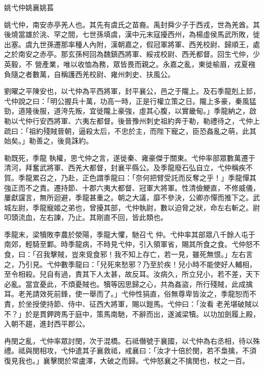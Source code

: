 
\begin{pinyinscope}

 姚弋仲姚襄姚萇



 姚弋仲，南安赤亭羌人也。其先有虞氏之苗裔。禹封舜少子于西戎，世為羌酋。其後燒當雄於洮、罕之間，七世孫填虞，漢中元末寇擾西州，為楊虛侯馬武所敗，徙出塞。虞九世孫遷那率種人內附，漢朝嘉之，假冠軍將軍、西羌校尉、歸順王，處之於南安之赤亭。那玄孫柯回為魏鎮西將軍、綏戎校尉、西羌都督。回生弋仲，少英毅，不
 營產業，唯以收恤為務，眾皆畏而親之。永嘉之亂，東徙榆眉，戎夏襁負隨之者數萬，自稱護西羌校尉、雍州刺史、扶風公。



 劉曜之平陳安也，以弋仲為平西將軍，封平襄公，邑之于隴上。及石季龍剋上邽，弋仲說之曰：「明公握兵十萬，功高一時，正是行權立策之日。隴上多豪，秦風猛勁，道隆後服，道洿先叛，宜徙隴上豪強，虛其心腹，以實畿甸。」季龍納之，啟勒以弋仲行安西將軍、六夷左都督。後晉豫州刺史祖約奔于勒，勒禮待之，弋仲上疏曰：「祖約殘賊晉朝，逼殺太后，不忠於主，而陛下寵之，臣恐姦亂之萌，此其始矣。」勒善之，後竟誅約。



 勒既死，季龍
 執權，思弋仲之言，遂徙秦、雍豪傑于關東。弋仲率部眾數萬遷于清河，拜奮武將軍、西羌大都督，封襄平縣公。及季龍廢石弘自立，弋仲稱疾不賀。季龍累召之，乃赴，正色謂季龍曰：「奈何把臂受託而反奪之乎！」季龍憚其強正而不之責。遷持節、十郡六夷大都督、冠軍大將軍。性清儉鯁直，不修威儀，屢獻讜言，無所迴避，季龍甚重之。朝之大議，靡不參決，公卿亦憚而推下之。武城左尉，季龍寵姬之弟也，曾擾其部，弋仲執尉，數以迫脅之狀，命左右斬之。尉叩頭流血，左右諫，乃止。其剛直不回，皆此類也。



 季龍末，梁犢敗李農於滎陽，季龍大懼，馳召弋
 仲。弋仲率其部眾八千餘人屯于南郊，輕騎至鄴。時季龍病，不時見弋仲，引入領軍省，賜其所食之食。弋仲怒不食，曰：「召我擊賊，豈來覓食邪！我不知上存亡，若一見，雖死無恨。」左右言之，乃引見。弋仲數季龍曰：「兒死來愁邪？乃至於疾！兒小時不能使好人輔相，至令相殺。兒自有過，責其下人太甚，故反耳。汝病久，所立兒小，若不差，天下必亂。當宜憂此，不煩憂賊也。犢等因思歸之心，共為姦盜，所行殘賊，此成擒耳。老羌請效死前鋒，使一舉而了。」弋仲性狷直，俗無尊卑皆汝之，季龍恕而不責，於坐授使持節、侍中、征西大將軍，賜以鎧馬。弋仲曰：「汝看
 老羌堪破賊以不？」於是貫鉀跨馬于庭中，策馬南馳，不辭而出，遂滅梁犢。以功加劍履上殿，入朝不趨，進封西平郡公。



 冉閔之亂，弋仲率眾討閔，次于混橋。石祗僭號于襄國，以弋仲為右丞相，待以殊禮。祗與閔相攻，弋仲遣其子襄救祗，戒襄曰：「汝才十倍於閔，若不梟擒，不須復見我也。」襄擊閔於常盧澤，大破之而歸。弋仲怒襄之不擒閔也，杖之一百。




\end{pinyinscope}
